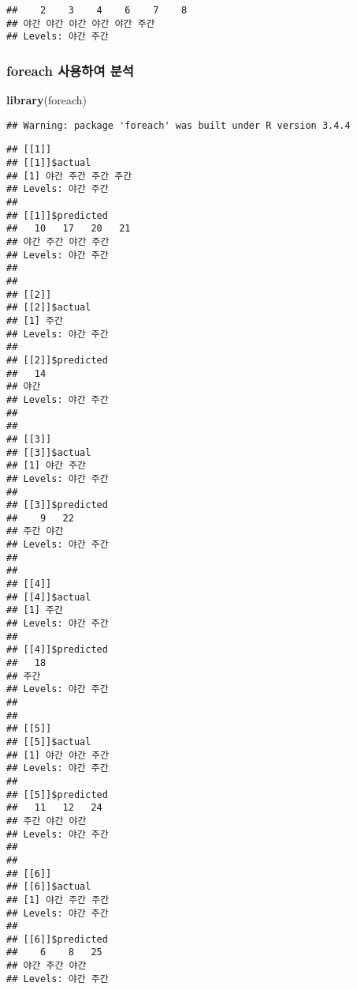 \documentclass[]{article}
\newenvironment{Shaded}{\begin{snugshade}}{\end{snugshade}}
\newcommand{\KeywordTok}[1]{\textcolor[rgb]{0.13,0.29,0.53}{\textbf{#1}}}
\newcommand{\DataTypeTok}[1]{\textcolor[rgb]{0.13,0.29,0.53}{#1}}
\newcommand{\StringTok}[1]{\textcolor[rgb]{0.31,0.60,0.02}{#1}}
\newcommand{\OperatorTok}[1]{\textcolor[rgb]{0.81,0.36,0.00}{\textbf{#1}}}
\newcommand{\NormalTok}[1]{#1}
\begin{document}
\begin{verbatim}
##    2    3    4    6    7    8 
## 야간 야간 야간 야간 야간 주간 
## Levels: 야간 주간
\end{verbatim}

\subsubsection{foreach 사용하여 분석}\label{foreach--}

\begin{Shaded}
\begin{Highlighting}[]
\KeywordTok{library}\NormalTok{(foreach) }
\end{Highlighting}
\end{Shaded}

\begin{verbatim}
## Warning: package 'foreach' was built under R version 3.4.4
\end{verbatim}

\begin{Shaded}
\end{Shaded}

\begin{verbatim}
## [[1]]
## [[1]]$actual
## [1] 야간 주간 주간 주간
## Levels: 야간 주간
## 
## [[1]]$predicted
##   10   17   20   21 
## 야간 주간 야간 주간 
## Levels: 야간 주간
## 
## 
## [[2]]
## [[2]]$actual
## [1] 주간
## Levels: 야간 주간
## 
## [[2]]$predicted
##   14 
## 야간 
## Levels: 야간 주간
## 
## 
## [[3]]
## [[3]]$actual
## [1] 야간 주간
## Levels: 야간 주간
## 
## [[3]]$predicted
##    9   22 
## 주간 야간 
## Levels: 야간 주간
## 
## 
## [[4]]
## [[4]]$actual
## [1] 주간
## Levels: 야간 주간
## 
## [[4]]$predicted
##   18 
## 주간 
## Levels: 야간 주간
## 
## 
## [[5]]
## [[5]]$actual
## [1] 야간 야간 주간
## Levels: 야간 주간
## 
## [[5]]$predicted
##   11   12   24 
## 주간 야간 야간 
## Levels: 야간 주간
## 
## 
## [[6]]
## [[6]]$actual
## [1] 야간 주간 주간
## Levels: 야간 주간
## 
## [[6]]$predicted
##    6    8   25 
## 야간 주간 야간 
## Levels: 야간 주간
\end{verbatim}
\end{document}
